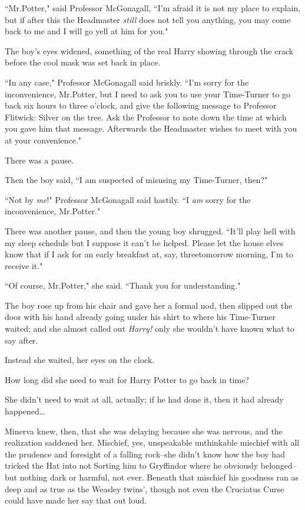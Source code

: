 ``Mr.\?Potter," said Professor McGonagall, ``I'm afraid it is not my place to explain, but if after this the Headmaster \emph{still} does not tell you anything, you may come back to me and I will go yell at him for you."

The boy's eyes widened, something of the real Harry showing through the crack before the cool mask was set back in place.

``In any case," Professor McGonagall said briskly. ``I'm sorry for the inconvenience, Mr.\?Potter, but I need to ask you to use your Time-Turner to go back six hours to three o'clock, and give the following message to Professor Flitwick: Silver on the tree. Ask the Professor to note down the time at which you gave him that message. Afterwards the Headmaster wishes to meet with you at your convenience."

There was a pause.

Then the boy said, ``I am suspected of misusing my Time-Turner, then?"

``Not by \emph{me}!" Professor McGonagall said hastily. ``I \emph{am} sorry for the inconvenience, Mr.\?Potter."

There was another pause, and then the young boy shrugged. ``It'll play hell with my sleep schedule but I suppose it can't be helped. Please let the house elves know that if I ask for an early breakfast at, say, three\am tomorrow morning, I'm to receive it."

``Of course, Mr.\?Potter," she said. ``Thank you for understanding."

The boy rose up from his chair and gave her a formal nod, then slipped out the door with his hand already going under his shirt to where his Time-Turner waited; and she almost called out \emph{Harry!} only she wouldn't have known what to say after.

Instead she waited, her eyes on the clock.

How long did she need to wait for Harry Potter to go back in time?

She didn't need to wait at all, actually; if he had done it, then it had already happened{\ldots}

Minerva knew, then, that she was delaying because she was nervous, and the realization saddened her. Mischief, yes, unspeakable unthinkable mischief with all the prudence and foresight of a falling rock\---she didn't know how the boy had tricked the Hat into not Sorting him to Gryffindor where he obviously belonged\---but nothing dark or harmful, not ever. Beneath that mischief his goodness ran as deep and as true as the Weasley twins', though not even the Cruciatus Curse could have made her say that out loud.

